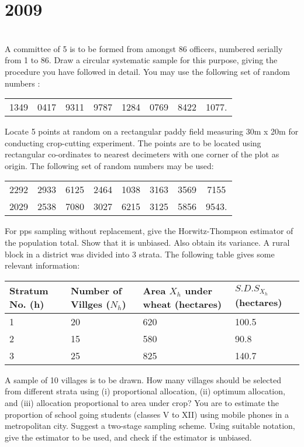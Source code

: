 \section*{2009}
\vspace{-.5cm}
\hrulefill \smallskip\\
 A committee of 5 is to be formed from amongst 86 officers, numbered serially from 1 to 86. Draw a circular systematic sample for this purpose, giving the procedure you have followed in detail. You may use the following set of random numbers : \\
\begin{tabular}{cccccccc}
1349 & 0417 & 9311 & 9787 & 1284 & 0769 & 8422 & 1077.
\end{tabular} 
\myline
{} Locate 5 points at random on a rectangular paddy field measuring 30m x 20m for conducting crop-cutting experiment. The points are to be located using rectangular co-ordinates to nearest decimeters with one corner of the plot as origin. The following set of random numbers may be used:
\begin{tabular}{cccccccc}
2292 & 2933 & 6125 & 2464 & 1038 & 3163 & 3569 & 7155\\
2029 & 2538 & 7080 & 3027 & 6215 & 3125 & 5856 & 9543.
\end{tabular} 
\myline
{} For pps sampling without replacement, give the Horwitz-Thompson estimator of the population total. Show that it is unbiased. Also obtain its variance.
\myline
{} A rural block in a district was divided into 3 strata. The following table gives some relevant information:
\begin{center}
    \begin{tabular}{|p{2cm}|p{2.2cm}|p{2.3cm}|p{2cm}|}
        \hline
         Stratum No. (h) & Number of Villges ($N_h$) & Area $X_h$ under wheat (hectares) & $S.D.S_{X_h}$ (hectares) \\ \hline
         1 & 20 & 620 & 100.5 \\
         2 & 15 & 580 & 90.8 \\ 
         3 & 25 & 825 & 140.7 \\ \hline
    \end{tabular}
\end{center} A sample of 10 villages is to be drawn. How many villages should be selected from different strata using (i) proportional allocation, (ii) optimum allocation, and (iii) allocation proportional to area under crop?
\myline
{} You are to estimate the proportion of school going students (classes V to XII) using mobile phones in a metropolitan city. Suggest a two-stage sampling scheme. Using suitable notation, give the estimator to be used, and check if the estimator is unbiased.
